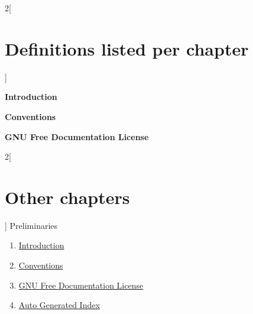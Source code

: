 \documentclass{stacks-project-book}
\theoremstyle{plain}
\theoremstyle{definition}
\theoremstyle{remark}
\numberwithin{equation}{subsection}
\begin{document}
\begin{multicols}{2}[\section{Definitions listed per chapter}\label{index-section-per-chapter}]

\medskip\noindent
{\bf Introduction}

\medskip

\medskip\noindent
{\bf Conventions}

\medskip

\medskip\noindent
{\bf GNU Free Documentation License}

\medskip
\end{multicols}

\begin{multicols}{2}[\section{Other chapters}]
\noindent
Preliminaries
\begin{enumerate}
\item \hyperref[introduction-section-phantom]{Introduction}
\item \hyperref[conventions-section-phantom]{Conventions}
\item \hyperref[fdl-section-phantom]{GNU Free Documentation License}
\item \hyperref[index-section-phantom]{Auto Generated Index}
\end{enumerate}
\end{multicols}


\end{document}
